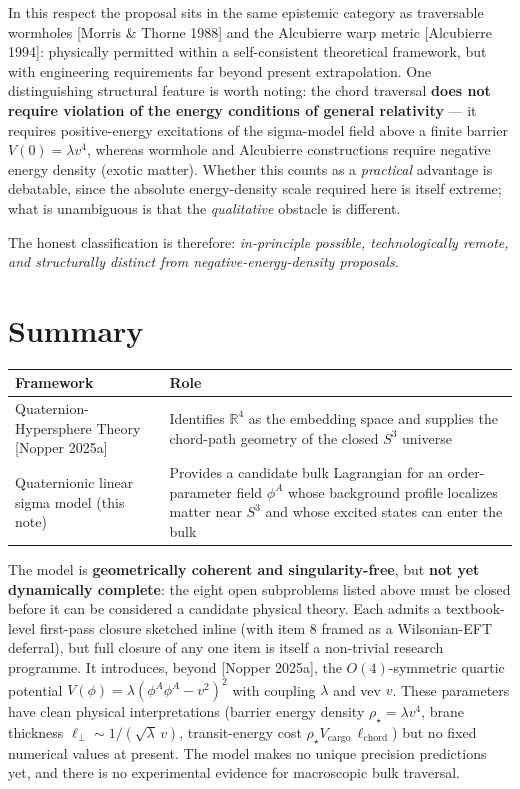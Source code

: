 \documentclass[11pt,a4paper]{article}
\begin{document}
In this respect the proposal sits in the same epistemic category as traversable wormholes [Morris \& Thorne 1988] and the Alcubierre warp metric [Alcubierre 1994]: physically permitted within a self-consistent theoretical framework, but with engineering requirements far beyond present extrapolation. One distinguishing structural feature is worth noting: the chord traversal \textbf{does not require violation of the energy conditions of general relativity} --- it requires positive-energy excitations of the sigma-model field above a finite barrier $V(0)=\lambda v^4$, whereas wormhole and Alcubierre constructions require negative energy density (exotic matter). Whether this counts as a \emph{practical} advantage is debatable, since the absolute energy-density scale required here is itself extreme; what is unambiguous is that the \emph{qualitative} obstacle is different.

The honest classification is therefore: \emph{in-principle possible, technologically remote, and structurally distinct from negative-energy-density proposals}.

\section{Summary}
\label{sec:summary}

\begin{table}[H]
\centering
\begin{tabularx}{\linewidth}{@{}p{5.5cm}X@{}}
\toprule
Framework & Role \\
\midrule
Quaternion-Hypersphere Theory [Nopper 2025a] & Identifies $\mathbb{R}^4$ as the embedding space and supplies the chord-path geometry of the closed $S^3$ universe \\
Quaternionic linear sigma model (this note) & Provides a candidate bulk Lagrangian for an order-parameter field $\phi^A$ whose background profile localizes matter near $S^3$ and whose excited states can enter the bulk \\
\bottomrule
\end{tabularx}
\end{table}

The model is \textbf{geometrically coherent and singularity-free}, but \textbf{not yet dynamically complete}: the eight open subproblems listed above must be closed before it can be considered a candidate physical theory. Each admits a textbook-level first-pass closure sketched inline (with item 8 framed as a Wilsonian-EFT deferral), but full closure of any one item is itself a non-trivial research programme. It introduces, beyond [Nopper 2025a], the $O(4)$-symmetric quartic potential $V(\phi)=\lambda(\phi^A\phi^A-v^2)^2$ with coupling $\lambda$ and vev $v$. These parameters have clean physical interpretations (barrier energy density $\rho_\star=\lambda v^4$, brane thickness $\ell_\perp\sim1/(\sqrt{\lambda}\,v)$, transit-energy cost $\rho_\star V_{\text{cargo}}\,\ell_{\mathrm{chord}}$) but no fixed numerical values at present. The model makes no unique precision predictions yet, and there is no experimental evidence for macroscopic bulk traversal.
\end{document}
